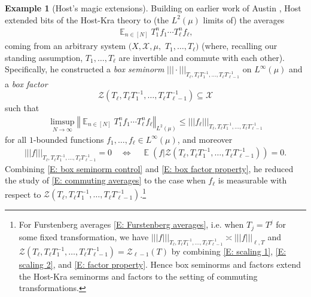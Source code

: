 \documentclass[11pt]{amsart}
\theoremstyle{definition}
\newtheorem{example}[lemma]{Example}
\DeclareMathOperator*{\E}{\mathbb{E}}
\newcommand{\CX}{{\mathcal X}}
\newcommand{\CZ}{{\mathcal Z}}
\newcommand{\norm}[1]{\left\Vert #1\right\Vert}
\newcommand{\nnorm}[1]{\lvert\!|\!| #1|\!|\!\rvert}
\newcommand{\inv}{^{-1}}
\newcommand{\1}{{\mathbf{1}}}
\begin{document}
\begin{example}[Host's magic extensions]\label{Ex: Host example}
Building on earlier work of Austin \cite{A10b}, Host \cite{H09} extended bits of the Host-Kra theory to (the $L^2(\mu)$ limits of) the averages
\begin{align}\label{E: commuting averages}
    \E_{n\in[N]} T_1^n f_1 \cdots T_\ell^n f_\ell,
\end{align}
coming from an arbitrary system $(X, \CX, \mu,$\! $T_1, \ldots, T_\ell)$ (where, recalling our standing assumption, $T_1, \ldots, T_\ell$ are invertible and commute with each other). Specifically, he constructed a \emph{box seminorm} $\nnorm{\cdot}_{T_\ell, T_\ell T_1\inv, \ldots, T_\ell T_{\ell-1}\inv}$ on $L^\infty(\mu)$ and a \emph{box factor} $$\CZ(T_\ell, T_\ell T_1\inv, \ldots, T_\ell T_{\ell-1}\inv)\subseteq\CX$$ such that
\begin{align}\label{E: box seminorm control}
\limsup_{N\to\infty}\norm{\E_{n\in[N]} T_1^n f_1 \cdots T_\ell^n f_\ell}_{L^2(\mu)} \leq \nnorm{f_\ell}_{T_\ell, T_\ell T_1\inv, \ldots, T_\ell T_{\ell-1}\inv}
\end{align}
for all $1$-bounded functions $f_1, \ldots, f_\ell\in L^\infty(\mu)$, and moreover 
\begin{align}\label{E: box factor property}
\nnorm{f}_{T_\ell, T_\ell T_1\inv, \ldots, T_\ell T_{\ell-1}\inv} = 0 \quad \Longleftrightarrow \quad \E(f|\CZ(T_\ell, T_\ell T_1\inv, \ldots, T_\ell T_{\ell-1}\inv)) = 0.
\end{align} 
Combining \eqref{E: box seminorm control} and \eqref{E: box factor property}, he reduced the study of \eqref{E: commuting averages} to the case when $f_\ell$ is measurable with respect to $\CZ(T_\ell, T_\ell T_1\inv, \ldots, T_\ell T_{\ell-1}\inv)$.\footnote{For Furstenberg averages \eqref{E: Furstenberg averages}, i.e. when $T_j = T^j$ for some fixed transformation, we have $\nnorm{f}_{T_\ell, T_\ell T_1\inv, \ldots, T_\ell T_{\ell-1}\inv}\asymp \nnorm{f}_{\ell, T}$ and $\CZ(T_\ell, T_\ell T_1\inv, \ldots, T_\ell T_{\ell-1}\inv) = \CZ_{\ell-1}(T)$ by combining \eqref{E: scaling 1}, \eqref{E: scaling 2}, and \eqref{E: factor property}. Hence box seminorms and factors extend the Host-Kra seminorms and factors to the setting of commuting transformations.} 


\end{example}
\end{document}
